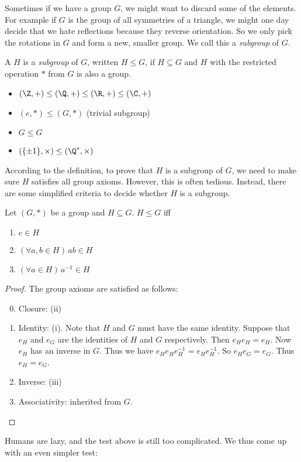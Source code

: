 \documentclass[a4paper]{article}
\begin{document}
Sometimes if we have a group $G$, we might want to discard some of the elements. For example if $G$ is the group of all symmetries of a triangle, we might one day decide that we hate reflections because they reverse orientation. So we only pick the rotations in $G$ and form a new, smaller group. We call this a \emph{subgroup} of $G$.

\begin{defi}[Subgroup]
  A $H$ is a \emph{subgroup} of $G$, written $H\leq G$, if $H\subseteq G$ and $H$ with the restricted operation $*$ from $G$ is also a group.
\end{defi}
\begin{eg}\leavevmode
  \begin{itemize}
    \item $(\Z, +)\leq (\Q, +) \leq (\R, +)\leq (\C, +)$
    \item $({e}, *) \leq (G, *)$ (trivial subgroup)
    \item $G \leq G$
    \item $(\{\pm 1\}, \times) \leq (\Q^*, \times)$
  \end{itemize}
\end{eg}

According to the definition, to prove that $H$ is a subgroup of $G$, we need to make sure $H$ satisfies all group axioms. However, this is often tedious. Instead, there are some simplified criteria to decide whether $H$ is a subgroup.
\begin{lemma}
  Let $(G, *)$ be a group and $H\subseteq G$. $H \leq G$ iff
  \begin{enumerate}
    \item $e \in H$
    \item $(\forall a, b\in H)\,ab \in H$
    \item $(\forall a \in H)\,a^{-1} \in H$
  \end{enumerate}
\end{lemma}
\begin{proof}
  The group axioms are satisfied as follows:
  \begin{enumerate}[label=\arabic{*}.]
      \setcounter{enumi}{-1}
    \item Closure: (ii)
    \item Identity: (i). Note that $H$ and $G$ must have the same identity. Suppose that $e_H$ and $e_G$ are the identities of $H$ and $G$ respectively. Then $e_He_H = e_H$. Now $e_H$ has an inverse in $G$. Thus we have $e_He_He_H^{-1} = e_He_H^{-1}$. So $e_He_G = e_G$. Thus $e_H = e_G$.
    \item Inverse: (iii)
    \item Associativity: inherited from $G$.\qedhere
  \end{enumerate}
\end{proof}
Humans are lazy, and the test above is still too complicated. We thus come up with an even simpler test:
\end{document}
